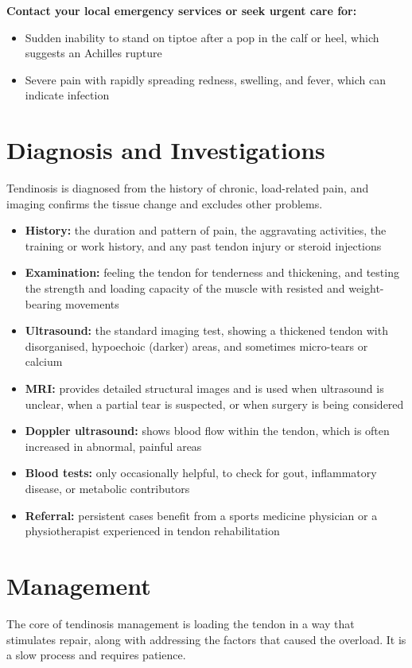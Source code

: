 \textbf{Contact your local emergency services or seek urgent care for:}
\begin{itemize}
    \item Sudden inability to stand on tiptoe after a pop in the calf or heel, which suggests an Achilles rupture
    \item Severe pain with rapidly spreading redness, swelling, and fever, which can indicate infection
\end{itemize}

\section*{Diagnosis and Investigations}
Tendinosis is diagnosed from the history of chronic, load-related pain, and imaging confirms the tissue change and excludes other problems.

\begin{itemize}
    \item \textbf{History:} the duration and pattern of pain, the aggravating activities, the training or work history, and any past tendon injury or steroid injections
    \item \textbf{Examination:} feeling the tendon for tenderness and thickening, and testing the strength and loading capacity of the muscle with resisted and weight-bearing movements
    \item \textbf{Ultrasound:} the standard imaging test, showing a thickened tendon with disorganised, hypoechoic (darker) areas, and sometimes micro-tears or calcium
    \item \textbf{MRI:} provides detailed structural images and is used when ultrasound is unclear, when a partial tear is suspected, or when surgery is being considered
    \item \textbf{Doppler ultrasound:} shows blood flow within the tendon, which is often increased in abnormal, painful areas
    \item \textbf{Blood tests:} only occasionally helpful, to check for gout, inflammatory disease, or metabolic contributors
    \item \textbf{Referral:} persistent cases benefit from a sports medicine physician or a physiotherapist experienced in tendon rehabilitation
\end{itemize}

\section*{Management}
The core of tendinosis management is loading the tendon in a way that stimulates repair, along with addressing the factors that caused the overload. It is a slow process and requires patience.

